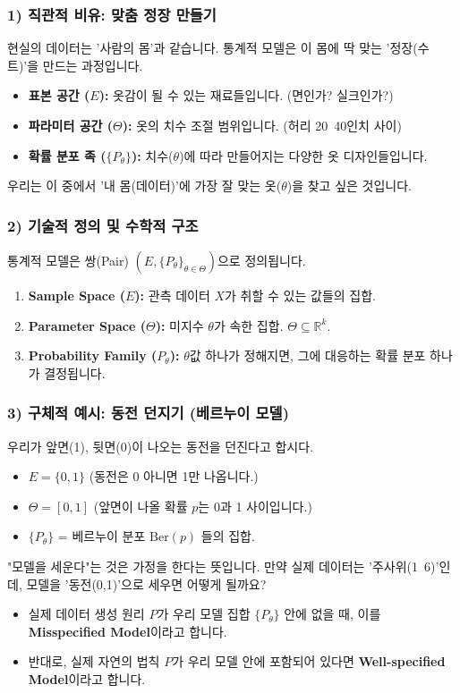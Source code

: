 \documentclass[11pt,a4paper]{book}
\theoremstyle{definition}
\begin{document}
\subsubsection*{1) 직관적 비유: 맞춤 정장 만들기}
현실의 데이터는 '사람의 몸'과 같습니다. 통계적 모델은 이 몸에 딱 맞는 '정장(수트)'을 만드는 과정입니다.
\begin{itemize}
    \item \textbf{표본 공간 ($E$):} 옷감이 될 수 있는 재료들입니다. (면인가? 실크인가?)
    \item \textbf{파라미터 공간 ($\Theta$):} 옷의 치수 조절 범위입니다. (허리 20~40인치 사이)
    \item \textbf{확률 분포 족 ($\{P_\theta\}$):} 치수($\theta$)에 따라 만들어지는 다양한 옷 디자인들입니다.
\end{itemize}
우리는 이 중에서 '내 몸(데이터)'에 가장 잘 맞는 옷($\theta$)을 찾고 싶은 것입니다.

\subsubsection*{2) 기술적 정의 및 수학적 구조}
통계적 모델은 쌍(Pair) $(E, \{P_\theta\}_{\theta \in \Theta})$으로 정의됩니다.
\begin{enumerate}
    \item \textbf{Sample Space ($E$):} 관측 데이터 $X$가 취할 수 있는 값들의 집합.
    \item \textbf{Parameter Space ($\Theta$):} 미지수 $\theta$가 속한 집합. $\Theta \subseteq \mathbb{R}^k$.
    \item \textbf{Probability Family ($P_\theta$):} $\theta$값 하나가 정해지면, 그에 대응하는 확률 분포 하나가 결정됩니다.
\end{enumerate}

\subsubsection*{3) 구체적 예시: 동전 던지기 (베르누이 모델)}
우리가 앞면(1), 뒷면(0)이 나오는 동전을 던진다고 합시다.
\begin{itemize}
    \item $E = \{0, 1\}$ (동전은 0 아니면 1만 나옵니다.)
    \item $\Theta = [0, 1]$ (앞면이 나올 확률 $p$는 0과 1 사이입니다.)
    \item $\{P_\theta\}$ = 베르누이 분포 $\text{Ber}(p)$ 들의 집합.
\end{itemize}

\begin{warningbox}[title={오해 방지: 잘 정의된 모델(Well-specified)이란?}]
"모델을 세운다"는 것은 가정을 한다는 뜻입니다. 만약 실제 데이터는 '주사위(1~6)'인데, 모델을 '동전(0,1)'으로 세우면 어떻게 될까요?
\begin{itemize}
    \item 실제 데이터 생성 원리 $P$가 우리 모델 집합 $\{P_\theta\}$ 안에 없을 때, 이를 \textbf{Misspecified Model}이라고 합니다.
    \item 반대로, 실제 자연의 법칙 $P$가 우리 모델 안에 포함되어 있다면 \textbf{Well-specified Model}이라고 합니다.
\end{itemize}
\end{warningbox}
\end{document}
